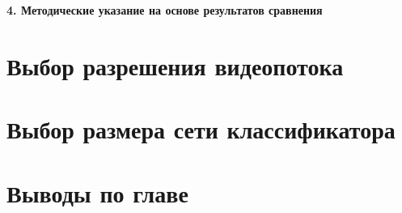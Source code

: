 \newpage
\begin{center}
  \textbf{\large 4. Методические указание на основе результатов сравнения}
\end{center}

\section{Выбор разрешения видеопотока}

\section{Выбор размера сети классификатора}


\section{Выводы по главе}

